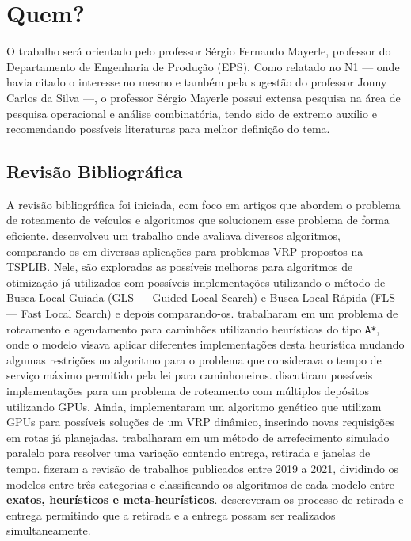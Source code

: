 \documentclass[
    openany,
    12pt,
    a4paper,
    twoside,
    english,
    brazil, sumario=tradicional
]{/home/lucas_galdino/Desktop/TCC/planning/abntex2/abntex2}
\begin{document}
\chapter{Quem?}

O trabalho será orientado pelo professor Sérgio Fernando Mayerle, professor do Departamento de Engenharia de Produção (EPS). Como relatado no N1 — onde havia citado o interesse no mesmo e também pela sugestão do professor Jonny Carlos da Silva —, o professor Sérgio Mayerle possui extensa pesquisa na área de pesquisa operacional e análise combinatória, tendo sido de extremo auxílio e recomendando possíveis literaturas para melhor definição do tema.

\section{Revisão Bibliográfica}

A revisão bibliográfica foi iniciada, com foco em artigos que abordem o problema de roteamento de veículos e algoritmos que solucionem esse problema de forma eficiente\@.  desenvolveu um trabalho onde avaliava diversos algoritmos, comparando-os em diversas aplicações para problemas VRP propostos na TSPLIB\@. Nele, são exploradas as possíveis melhoras para algoritmos de otimização já utilizados com possíveis implementações utilizando o método de Busca Local Guiada (GLS — Guided Local Search) e Busca Local Rápida (FLS — Fast Local Search) e depois comparando-os\@.  trabalharam em um problema de roteamento e agendamento para caminhões utilizando heurísticas do tipo \verb|A*|, onde o modelo visava aplicar diferentes implementações desta heurística mudando algumas restrições no algoritmo para o problema que considerava o tempo de serviço máximo permitido pela lei para caminhoneiros\@.  discutiram possíveis implementações para um problema de roteamento com múltiplos depósitos utilizando GPUs\@. Ainda,  implementaram um algoritmo genético que utilizam GPUs para possíveis soluções de um VRP dinâmico, inserindo novas requisições em rotas já planejadas\@.  trabalharam em um método de arrefecimento simulado paralelo para resolver uma variação contendo entrega, retirada e janelas de tempo\@.  fizeram a revisão de trabalhos publicados entre 2019 a 2021, dividindo os modelos entre três categorias e classificando os algoritmos de cada modelo entre \textbf{exatos, heurísticos e meta-heurísticos}\@.  descreveram os processo de retirada e entrega permitindo que a retirada e a entrega possam ser realizados simultaneamente.
\end{document}
